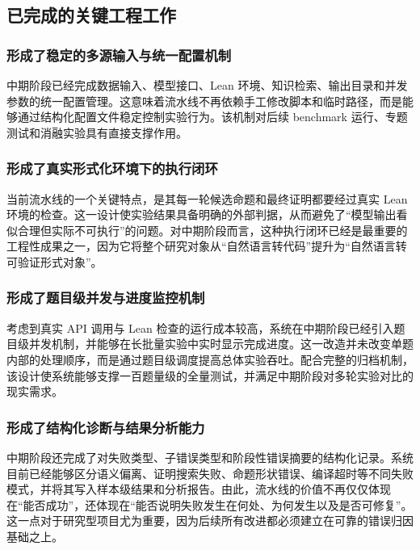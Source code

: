 \documentclass[12pt,a4paper]{ctexart}
\begin{document}
\subsection{已完成的关键工程工作}

\subsubsection{形成了稳定的多源输入与统一配置机制}

中期阶段已经完成数据输入、模型接口、Lean 环境、知识检索、输出目录和并发参数的统一配置管理。这意味着流水线不再依赖手工修改脚本和临时路径，而是能够通过结构化配置文件稳定控制实验行为。该机制对后续 benchmark 运行、专题测试和消融实验具有直接支撑作用。

\subsubsection{形成了真实形式化环境下的执行闭环}

当前流水线的一个关键特点，是其每一轮候选命题和最终证明都要经过真实 Lean 环境的检查。这一设计使实验结果具备明确的外部判据，从而避免了“模型输出看似合理但实际不可执行”的问题。对中期阶段而言，这种执行闭环已经是最重要的工程性成果之一，因为它将整个研究对象从“自然语言转代码”提升为“自然语言转可验证形式对象”。

\subsubsection{形成了题目级并发与进度监控机制}

考虑到真实 API 调用与 Lean 检查的运行成本较高，系统在中期阶段已经引入题目级并发机制，并能够在长批量实验中实时显示完成进度。这一改造并未改变单题内部的处理顺序，而是通过题目级调度提高总体实验吞吐。配合完整的归档机制，该设计使系统能够支撑一百题量级的全量测试，并满足中期阶段对多轮实验对比的现实需求。

\subsubsection{形成了结构化诊断与结果分析能力}

中期阶段还完成了对失败类型、子错误类型和阶段性错误摘要的结构化记录。系统目前已经能够区分语义偏离、证明搜索失败、命题形状错误、编译超时等不同失败模式，并将其写入样本级结果和分析报告。由此，流水线的价值不再仅仅体现在“能否成功”，还体现在“能否说明失败发生在何处、为何发生以及是否可修复”。这一点对于研究型项目尤为重要，因为后续所有改进都必须建立在可靠的错误归因基础之上。
\end{document}
